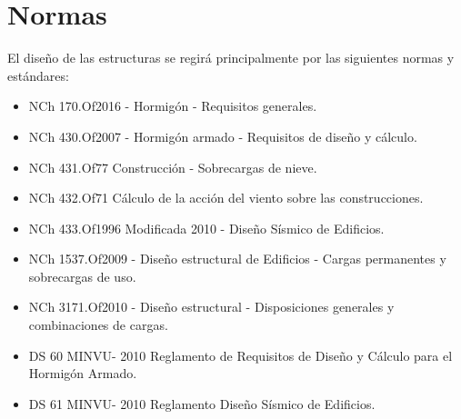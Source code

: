 \newpage
\section{Normas}

El diseño de las estructuras se regirá principalmente por las siguientes normas y estándares:

\begin{itemize}
    \item NCh 170.Of2016 - Hormigón - Requisitos generales.
    \item NCh 430.Of2007 - Hormigón armado - Requisitos de diseño y cálculo.
    \item NCh 431.Of77 Construcción - Sobrecargas de nieve.
    \item NCh 432.Of71 Cálculo de la acción del viento sobre las construcciones.
    \item NCh 433.Of1996 Modificada 2010 - Diseño Sísmico de Edificios.    
    \item NCh 1537.Of2009 - Diseño estructural de Edificios - Cargas permanentes y sobrecargas de uso.
    \item NCh 3171.Of2010 - Diseño estructural - Disposiciones generales y combinaciones de cargas.
    \item DS 60 MINVU- 2010 Reglamento de Requisitos de Diseño y Cálculo para el Hormigón Armado.
    \item DS 61 MINVU- 2010 Reglamento Diseño Sísmico de Edificios.
\end{itemize}